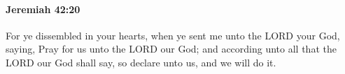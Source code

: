 
		\paragraph{Jeremiah 42:20} %
			\label{JEREMIAH-42-20}

			For ye dissembled in your hearts, when ye sent me unto the LORD your God, saying, Pray for us unto the LORD our God; and according unto all that the LORD our God shall say, so declare unto us, and we will do it.


